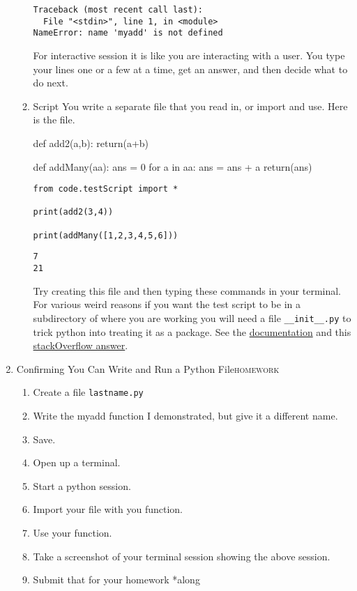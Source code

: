 \documentclass{article}
\begin{document}
\begin{enumerate}
\begin{enumerate}
\begin{verbatim}
Traceback (most recent call last):
  File "<stdin>", line 1, in <module>
NameError: name 'myadd' is not defined
\end{verbatim}


For interactive session it is like you are interacting with a user. You type your lines one or a few at a time, get an answer, and then decide what to do next. 
\item Script
\label{sec:org99a8243}
You write a separate file that you read in, or import and use. Here is the file.

def add2(a,b):
    return(a+b)

def addMany(aa):
    ans = 0
    for a in aa:
        ans = ans + a
    return(ans)

\begin{verbatim}
from code.testScript import *

print(add2(3,4))

print(addMany([1,2,3,4,5,6]))
\end{verbatim}

\begin{verbatim}
7
21
\end{verbatim}


Try creating this file and then typing these commands in your terminal. For various weird reasons if you want the test script to be in a subdirectory of where you are working you will need a file \texttt{\_\_init\_\_.py} to trick python into treating it as a package. See the \href{https://docs.python.org/3/tutorial/modules.html\#packages}{documentation} and this \href{https://stackoverflow.com/questions/1260792/import-a-file-from-a-subdirectory}{stackOverflow answer}.
\end{enumerate}
\item Confirming You Can Write and Run a Python File\hfill{}\textsc{homework}
\label{sec:org1751a91}
\begin{enumerate}
\item Create a file \texttt{lastname.py}
\item Write the myadd function I demonstrated, but give it a different name.
\item Save.
\item Open up a terminal.
\item Start a python session.
\item Import your file with you function.
\item Use your function.
\item Take a screenshot of your terminal session showing the above session.
\item Submit that for your homework *along
\end{enumerate}
\end{enumerate}
\end{document}
